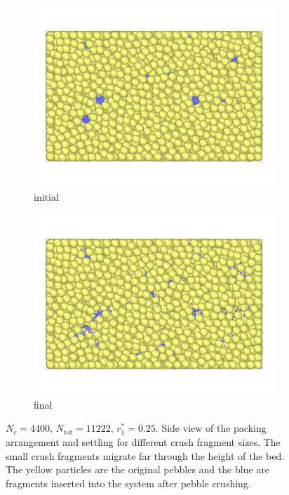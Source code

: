 \begin{figure}[!ht]
	\begin{subfigure}[b]{\doubleimagewidth}
		\centering
		\includegraphics[width=\textwidth]{chapters/figures/crush-fragments/0.25-1.png}
		\caption{initial}
	\end{subfigure}
	\begin{subfigure}[b]{\doubleimagewidth}
		\centering
		\includegraphics[width=\textwidth]{chapters/figures/crush-fragments/0.25-2.png}
		\caption{final}
	\end{subfigure}
	\caption{$N_c = 4400$, $N_\text{tot} = 11222$, $r_1^* = 0.25$. Side view of the packing arrangement and settling for different crush fragment sizes. The small crush fragments migrate far through the height of the bed. The yellow particles are the original pebbles and the blue are fragments inserted into the system after pebble crushing.}
\label{fig:crush-settling-pictures-2}
\end{figure}

